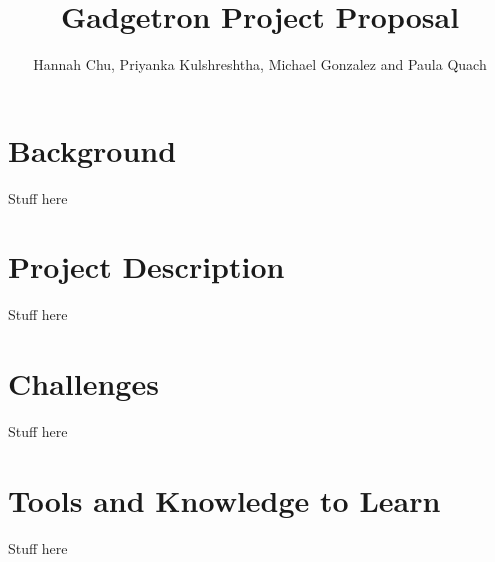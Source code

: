 \documentclass[12pt]{article}
\begin{document}
\author{Hannah Chu, Priyanka Kulshreshtha, Michael Gonzalez and Paula Quach}
\title{Gadgetron Project Proposal}
\maketitle

\section{Background}
Stuff here

\section{Project Description}
Stuff here 

\section{Challenges}
Stuff here

\section{Tools and Knowledge to Learn}
Stuff here



\end{document}

